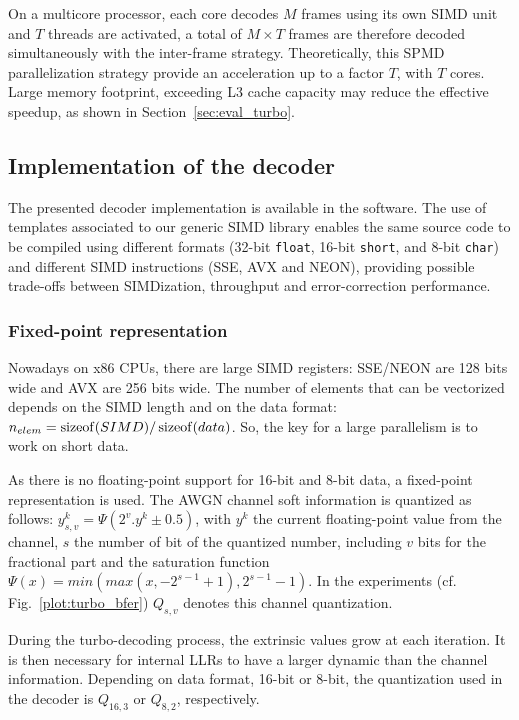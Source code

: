 On a multicore processor, each core decodes $M$ frames using its own SIMD unit
and $T$ threads are activated, a total of $M\times T$ frames are therefore
decoded simultaneously with the inter-frame strategy. Theoretically, this SPMD
parallelization strategy provide an acceleration up to a factor $T$, with $T$
cores. Large memory footprint, exceeding L3 cache capacity may reduce the
effective speedup, as shown in Section~\ref{sec:eval_turbo}.

\subsection{Implementation of the decoder}
\label{sec:turbo_implem}

The presented decoder implementation is available in the \AFFECT software. The
use of \Cxx templates associated to our generic SIMD library enables the
same source code to be compiled using different formats (32-bit \verb|float|,
16-bit \verb|short|, and 8-bit \verb|char|) and different SIMD instructions
(SSE, AVX and NEON), providing possible trade-offs between SIMDization,
throughput and error-correction performance.

\subsubsection{Fixed-point representation}

Nowadays on x86 CPUs, there are large SIMD registers: SSE/NEON are 128 bits
wide and AVX are 256 bits wide. The number of elements that can be vectorized
depends on the SIMD length and on the data format:
$n_{elem} = \operatorname*{sizeof}(SIMD) / \operatorname*{sizeof}(data)$. So, the key for a large parallelism
is to work on short data.

As there is no floating-point support for 16-bit and 8-bit data, a fixed-point
representation is used. The AWGN channel soft information is quantized as
follows: $y_{s,v}^k = \Psi(2^v . y^k \pm 0.5)$, with $y^k$ the current
floating-point value from the channel, $s$ the number of bit of the quantized
number, including $v$ bits for the fractional part and the saturation function
$\Psi(x) = min(max(x, -2^{s-1} +1), 2^{s-1} -1)$. In the experiments
(cf. Fig.~\ref{plot:turbo_bfer}) $Q_{s,v}$ denotes this channel quantization.

During the turbo-decoding process, the extrinsic values grow at each iteration.
It is then necessary for internal LLRs to have a larger dynamic than the channel
information. Depending on data format, 16-bit or 8-bit, the quantization used in
the decoder is $Q_{16,3}$ or $Q_{8,2}$, respectively.

